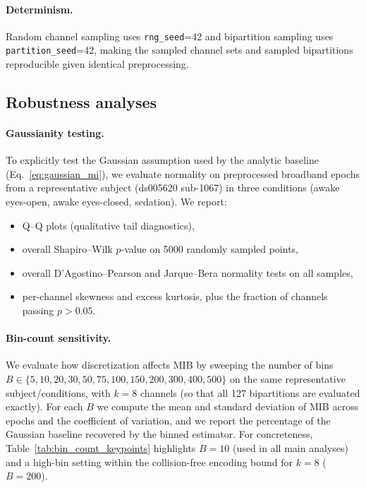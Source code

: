 \documentclass[11pt]{article}
\begin{document}
\paragraph{Determinism.}
Random channel sampling uses \texttt{rng\_seed}=42 and bipartition sampling uses \texttt{partition\_seed}=42, making the sampled channel sets and sampled bipartitions reproducible given identical preprocessing.

\subsection{Robustness analyses}
\paragraph{Gaussianity testing.}
To explicitly test the Gaussian assumption used by the analytic baseline (Eq.~\eqref{eq:gaussian_mi}), we evaluate normality on preprocessed broadband epochs from a representative subject (ds005620 sub-1067) in three conditions (awake eyes-open, awake eyes-closed, sedation). We report:
\begin{itemize}[leftmargin=*]
    \item Q--Q plots (qualitative tail diagnostics),
    \item overall Shapiro--Wilk $p$-value on 5000 randomly sampled points,
    \item overall D'Agostino--Pearson and Jarque--Bera normality tests on all samples,
    \item per-channel skewness and excess kurtosis, plus the fraction of channels passing $p>0.05$.
\end{itemize}

\paragraph{Bin-count sensitivity.}
We evaluate how discretization affects MIB by sweeping the number of bins $B \in \{5,10,20,30,50,75,100,150,200,300,400,500\}$ on the same representative subject/conditions, with $k=8$ channels (so that all 127 bipartitions are evaluated exactly). For each $B$ we compute the mean and standard deviation of MIB across epochs and the coefficient of variation, and we report the percentage of the Gaussian baseline recovered by the binned estimator. For concreteness, Table~\ref{tab:bin_count_keypoints} highlights $B=10$ (used in all main analyses) and a high-bin setting within the collision-free encoding bound for $k=8$ ($B=200$).
\end{document}
